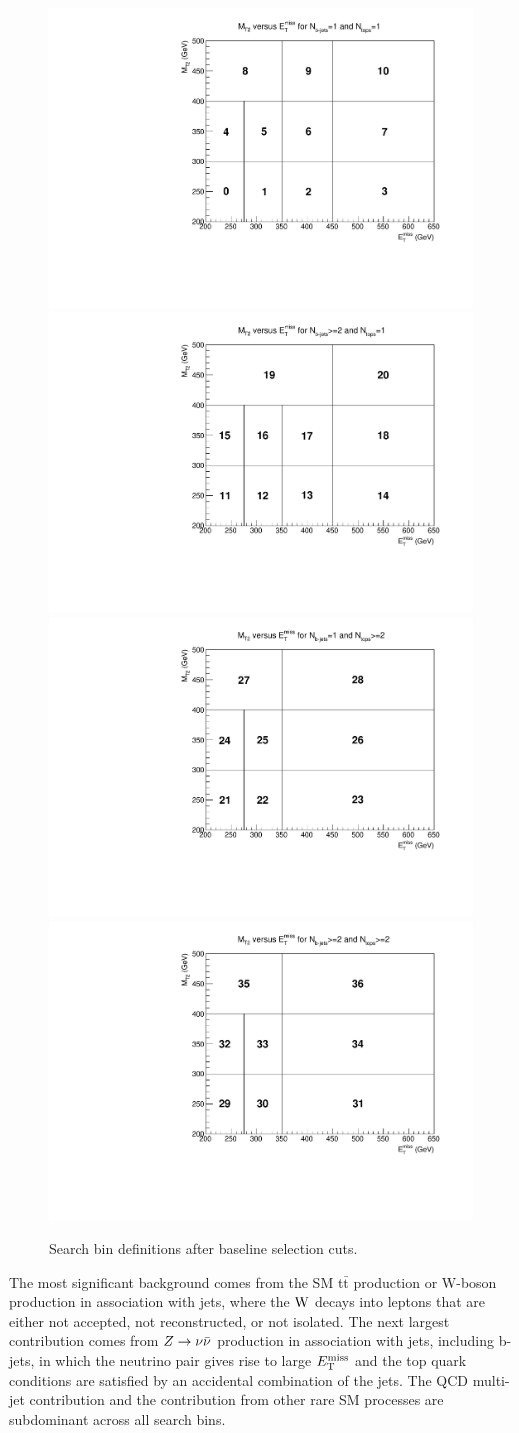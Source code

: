 \begin{figure}[h]
  \begin{center}
    \includegraphics[width=0.45\linewidth]{HadStopPaper/figures/poly_MT2_vs_met_merged_0.pdf}
    \includegraphics[width=0.45\linewidth]{HadStopPaper/figures/poly_MT2_vs_met_merged_1.pdf} \\
    \includegraphics[width=0.45\linewidth]{HadStopPaper/figures/poly_MT2_vs_met_merged_3.pdf} 
    \includegraphics[width=0.45\linewidth]{HadStopPaper/figures/poly_MT2_vs_met_merged_4.pdf} \\
    \caption{ Search bin definitions after baseline selection cuts. }
    \label{fig:hadstopArray}
  \end{center}
\end{figure}

The most significant background comes from the SM t$\bar{\text{t}}$ production or W-boson production in association with jets, where the ${\rm W}$ decays into leptons that are either not accepted, not reconstructed, or not isolated. The next largest contribution comes from $Z\rightarrow \nu\bar{\nu}$ production in association with jets, including b-jets, in which the neutrino pair gives rise to large $E_{\text{T}}^{\rm miss}$ and the top quark conditions are satisfied by an accidental combination of the jets. The QCD multi-jet contribution and the contribution from other rare SM processes are subdominant across all search bins. 


